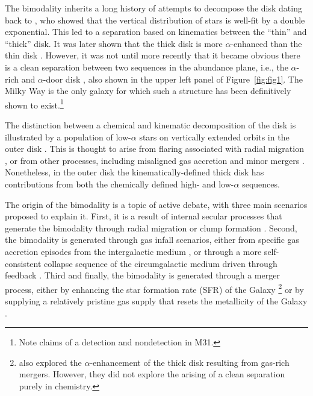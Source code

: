 The bimodality inherits a long history of attempts to decompose the disk dating back to \citet{1983MNRAS.202.1025G}, who showed that the vertical distribution of stars is well-fit by a double exponential. This led to a separation based on kinematics between the ``thin'' and ``thick'' disk. It was later shown that the thick disk is more $\alpha$-enhanced than the thin disk \citep{1996ASPC...92..307G,1998A&A...338..161F,2004AN....325....3F,2006MNRAS.367.1329R}. However, it was not until more recently that it became obvious there is a clean separation between two sequences in the abundance plane, i.e., the $\alpha$-rich and $\alpha$-door disk \citep{2011A&A...535L..11A,2012A&A...545A..32A,2014A&A...562A..71B,2014ApJ...796...38N,2020MNRAS.493.2952H}, also shown in the upper left panel of Figure~\ref{fig:fig1}. The Milky Way is the only galaxy for which such a structure has been definitively shown to exist.\footnote{Note claims of a detection \citep{2023ApJ...956L..14K} and nondetection \citep{2024IAUS..377..115N} in M31.}

The distinction between a chemical and kinematic decomposition of the disk is illustrated by a population of low-$\alpha$ stars on vertically extended orbits in the outer disk \citep{2015ApJ...808..132H,2016ApJ...823...30B}. This is thought to arise from flaring associated with radial migration \citep{2015ApJ...804L...9M,2016ApJ...831..139M}, or from other processes, including misaligned gas accretion and minor mergers \citep{2010MNRAS.408..783R,2009MNRAS.396..696S}. Nonetheless, in the outer disk the kinematically-defined thick disk has contributions from both the chemically defined high- and low-$\alpha$ sequences.

The origin of the bimodality is a topic of active debate, with three main scenarios proposed to explain it. First, it is a result of internal secular processes that generate the bimodality through radial migration \citep{2009MNRAS.396..203S,2021MNRAS.507.5882S,2023MNRAS.523.3791C} or clump formation \citep{2019MNRAS.484.3476C,2020MNRAS.492.4716B,2021MNRAS.502..260B,2023ApJ...953..128G}. Second, the bimodality is generated through gas infall scenarios, either from specific gas accretion episodes from the intergalactic medium \citep{1997ApJ...477..765C,2009IAUS..254..191C,2017MNRAS.472.3637G,2019A&A...623A..60S}, or through a more self-consistent collapse sequence of the circumgalactic medium driven through feedback \citep{2021MNRAS.501.5176K}. Third and finally, the bimodality is generated through a merger process, either by enhancing the star formation rate (SFR) of the Galaxy \citep{2018MNRAS.474.3629G}\footnote{\citet{2004ApJ...612..894B,2005ApJ...630..298B,2007ApJ...658...60B,2010MNRAS.402.1489R} also explored the $\alpha$-enhancement of the thick disk resulting from gas-rich mergers. However, they did not explore the arising of a clean separation purely in chemistry.} or by supplying a relatively pristine gas supply that resets the metallicity of the Galaxy \citep{2020MNRAS.491.5435B,2024MNRAS.528L.122C}.

